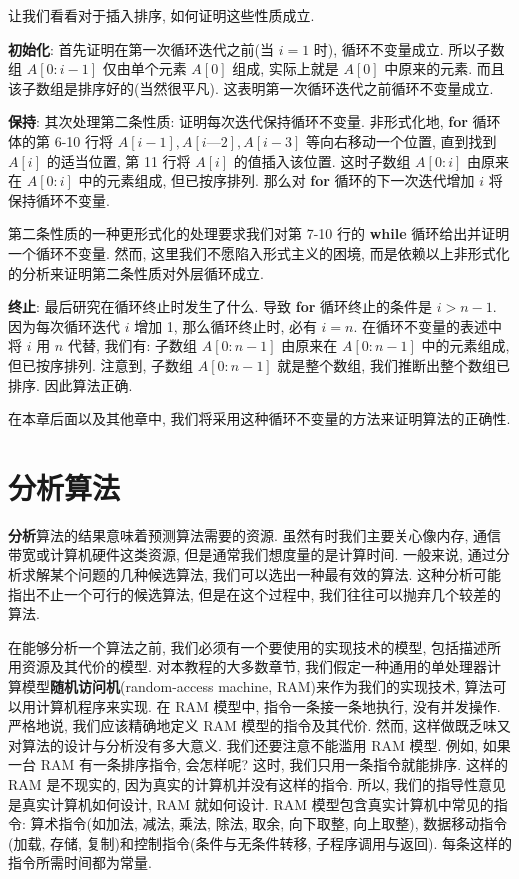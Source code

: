 \documentclass[oneside,10pt,fontset=none]{ctexbook}
\numberwithin{definition}{chapter}
\numberwithin{theorem}{chapter}
\numberwithin{lemma}{chapter}
\begin{document}
让我们看看对于插入排序, 如何证明这些性质成立.

\textbf{初始化}: 首先证明在第一次循环迭代之前(当 $i=1$ 时), 循环不变量成立. 所以子数组 $A[0:i-1]$ 仅由单个元素 $A[0]$ 组成, 实际上就是 $A[0]$ 中原来的元素. 而且该子数组是排序好的(当然很平凡). 这表明第一次循环迭代之前循环不变量成立.

\textbf{保持}: 其次处理第二条性质: 证明每次迭代保持循环不变量. 非形式化地, \textbf{for} 循环体的第 6-10 行将 $A[i-1], A[i—2], A[i-3]$ 等向右移动一个位置, 直到找到 $A[i]$ 的适当位置, 第 11 行将 $A[i]$ 的值插入该位置. 这时子数组 $A[0:i]$ 由原来在 $A[0:i]$ 中的元素组成, 但已按序排列. 那么对 \textbf{for} 循环的下一次迭代增加 $i$ 将保持循环不变量.

第二条性质的一种更形式化的处理要求我们对第 7-10 行的 \textbf{while} 循环给出并证明一个循环不变量. 然而, 这里我们不愿陷入形式主义的困境, 而是依赖以上非形式化的分析来证明第二条性质对外层循环成立.

\textbf{终止}: 最后研究在循环终止时发生了什么. 导致 \textbf{for} 循环终止的条件是 $i > n - 1$. 因为每次循环迭代 $i$ 增加 1, 那么循环终止时, 必有 $i=n$. 在循环不变量的表述中将 $i$ 用 $n$ 代替, 我们有: 子数组 $A[0:n-1]$ 由原来在 $A[0:n-1]$ 中的元素组成, 但已按序排列. 注意到, 子数组 $A[0:n-1]$ 就是整个数组, 我们推断出整个数组已排序. 因此算法正确.

在本章后面以及其他章中, 我们将采用这种循环不变量的方法来证明算法的正确性.

\section{分析算法}

\textbf{分析}算法的结果意味着预测算法需要的资源. 虽然有时我们主要关心像内存, 通信带宽或计算机硬件这类资源, 但是通常我们想度量的是计算时间. 一般来说, 通过分析求解某个问题的几种候选算法, 我们可以选出一种最有效的算法. 这种分析可能指出不止一个可行的候选算法, 但是在这个过程中, 我们往往可以抛弃几个较差的算法.

在能够分析一个算法之前, 我们必须有一个要使用的实现技术的模型, 包括描述所用资源及其代价的模型. 对本教程的大多数章节, 我们假定一种通用的单处理器计算模型\textbf{随机访问机}(random-access machine, RAM)来作为我们的实现技术, 算法可以用计算机程序来实现. 在 RAM 模型中, 指令一条接一条地执行, 没有并发操作. 严格地说, 我们应该精确地定义 RAM 模型的指令及其代价. 然而, 这样做既乏味又对算法的设计与分析没有多大意义. 我们还要注意不能滥用 RAM 模型. 例如, 如果一台 RAM 有一条排序指令, 会怎样呢? 这时, 我们只用一条指令就能排序. 这样的 RAM 是不现实的, 因为真实的计算机并没有这样的指令. 所以, 我们的指导性意见是真实计算机如何设计, RAM 就如何设计. RAM 模型包含真实计算机中常见的指令: 算术指令(如加法, 减法, 乘法, 除法, 取余, 向下取整, 向上取整), 数据移动指令(加载, 存储, 复制)和控制指令(条件与无条件转移, 子程序调用与返回). 每条这样的指令所需时间都为常量.
\end{document}

